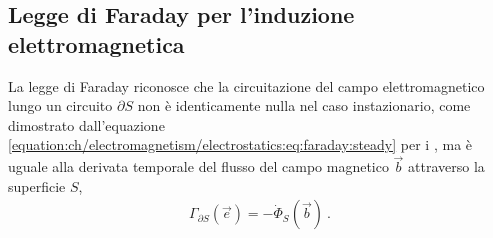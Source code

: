\documentclass[letterpaper,10pt,italian]{jupyterBook}
\begin{document}
\subsection{Legge di Faraday per l’induzione elettromagnetica}
\label{\detokenize{ch/electromagnetism/electromagnetism-general:legge-di-faraday-per-l-induzione-elettromagnetica}}\label{\detokenize{ch/electromagnetism/electromagnetism-general:physics-hs-electromagnetism-electromagnetism-general-em-induction}}
\sphinxAtStartPar
La legge di Faraday riconosce che la circuitazione del campo elettromagnetico lungo un circuito \(\partial S\) non è identicamente nulla nel caso instazionario, come dimostrato dall’equazione \eqref{equation:ch/electromagnetism/electrostatics:eq:faraday:steady} per i {\hyperref[\detokenize{ch/electromagnetism/electrostatics:physics-hs-electromagnetism-electrostatics-maxwell-faraday}]{}}, ma è uguale alla derivata temporale del flusso del campo magnetico \(\vec{b}\) attraverso la superficie \(S\),
\begin{equation}\label{equation:ch/electromagnetism/electromagnetism-general:eq:faraday}
\begin{split}\Gamma_{\partial S}(\vec{e}) = - \dot{\Phi}_S(\vec{b}) \ .\end{split}
\end{equation}
\end{document}
